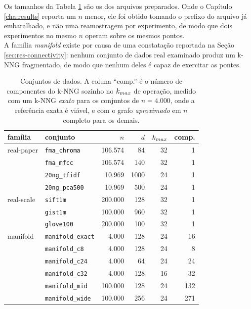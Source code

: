 Os tamanhos da Tabela \ref{tab:datasets} são os dos arquivos preparados. Onde o Capítulo \ref{cha:results} reporta um $n$ menor, ele foi obtido tomando o prefixo do arquivo já embaralhado, e não uma reamostragem por experimento, de modo que dois experimentos no mesmo $n$ operam sobre os mesmos pontos.\\

A família \textit{manifold} existe por causa de uma constatação reportada na Seção \ref{sec:res-connectivity}: nenhum conjunto de dados real examinado produz um \ac{k-NNG} fragmentado, de modo que nenhum deles é capaz de exercitar as pontes.\\

\begin{table}[htb!]
\caption{\label{tab:datasets} Conjuntos de dados. A coluna ``comp.'' é o número de componentes do \ac{k-NNG} sozinho no $k_{max}$ de operação, medido com um \ac{k-NNG} \textit{exato} para os conjuntos de $n = 4.000$, onde a referência exata é viável, e com o grafo \textit{aproximado} em $n$ completo para os demais.}
\centering
\footnotesize
\begin{tabular}{@{}llrrrr@{}}
\toprule
família & conjunto & $n$ & $d$ & $k_{max}$ & comp. \\
\midrule
real-paper & \texttt{fma\_chroma}   & 106.574 & 84   & 32 & 1 \\
           & \texttt{fma\_mfcc}     & 106.574 & 140  & 32 & 1 \\
           & \texttt{20ng\_tfidf}   & 10.969  & 1000 & 24 & 1 \\
           & \texttt{20ng\_pca500}  & 10.969  & 500  & 24 & 1 \\
\midrule
real-scale & \texttt{sift1m}        & 200.000 & 128  & 32 & 1 \\
           & \texttt{gist1m}        & 100.000 & 960  & 32 & 1 \\
           & \texttt{glove100}      & 200.000 & 100  & 32 & 1 \\
\midrule
manifold   & \texttt{manifold\_exact} & 4.000   & 128 & 24 & 16 \\
           & \texttt{manifold\_c8}    & 4.000   & 128 & 24 & 8  \\
           & \texttt{manifold\_c24}   & 4.000   & 64  & 24 & 24 \\
           & \texttt{manifold\_c32}   & 4.000   & 128 & 16 & 32 \\
           & \texttt{manifold\_mid}   & 100.000 & 128 & 24 & 132 \\
           & \texttt{manifold\_wide}  & 100.000 & 256 & 24 & 271 \\

\end{tabular}
\end{table}
